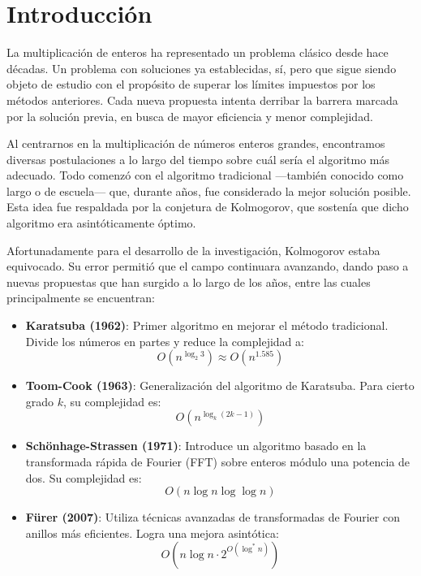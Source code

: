 \chapter{Introducción}
\label{ch:into} %

\textbf{} La multiplicación de enteros ha representado un problema clásico desde hace décadas. Un problema con soluciones ya establecidas, sí, pero que sigue siendo objeto de estudio con el propósito de superar los límites impuestos por los métodos anteriores. Cada nueva propuesta intenta derribar la barrera marcada por la solución previa, en busca de mayor eficiencia y menor complejidad.

Al centrarnos en la multiplicación de números enteros grandes, encontramos diversas postulaciones a lo largo del tiempo sobre cuál sería el algoritmo más adecuado. Todo comenzó con el algoritmo tradicional —también conocido como largo o de escuela— que, durante años, fue considerado la mejor solución posible. Esta idea fue respaldada por la conjetura de Kolmogorov, que sostenía que dicho algoritmo era asintóticamente óptimo.

Afortunadamente para el desarrollo de la investigación, Kolmogorov estaba equivocado. Su error permitió que el campo continuara avanzando, dando paso a nuevas propuestas que han surgido a lo largo de los años, entre las cuales principalmente se encuentran:
\begin{itemize}
    \item \textbf{Karatsuba (1962)}: Primer algoritmo en mejorar el método tradicional. Divide los números en partes y reduce la complejidad a:
    \[
    O(n^{\log_2 3}) \approx O(n^{1.585})
    \]
    
    \item \textbf{Toom-Cook (1963)}: Generalización del algoritmo de Karatsuba. Para cierto grado $k$, su complejidad es:
    \[
    O(n^{\log_k (2k - 1)})
    \]

    \item \textbf{Sch\"onhage-Strassen (1971)}: Introduce un algoritmo basado en la transformada rápida de Fourier (FFT) sobre enteros módulo una potencia de dos. Su complejidad es:
    \[
    O(n \log n \log \log n)
    \]

    \item \textbf{F\"urer (2007)}: Utiliza técnicas avanzadas de transformadas de Fourier con anillos más eficientes. Logra una mejora asintótica:
    \[
    O\left(n \log n \cdot 2^{O(\log^* n)}\right)
    \]
\end{itemize}


